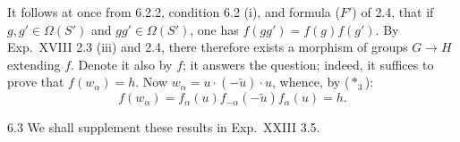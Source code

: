 It follows at once from 6.2.2, condition 6.2 (i), and formula ($F'$) of 2.4, that if $g,g'\in\Omega(S')$ and $gg'\in\Omega(S')$, one has $f(gg')=f(g)f(g')$. By Exp.~XVIII 2.3 (iii) and 2.4,{\renewcommand{\thefootnote}{(39)}} there therefore exists a morphism of groups $G\to H$ extending $f$. Denote it also by $f$; it answers the question; indeed, it suffices to prove that $f(w_\alpha)=h$. Now $w_\alpha=u\cdot(-\widetilde u)\cdot u$, whence, by ($*_3$):{\renewcommand{\thefootnote}{(40)}}
\[
f(w_\alpha)=f_\alpha(u)f_{-\alpha}(-\widetilde u)f_\alpha(u)=h.
\]
\begin{remark}{6.3}\label{XX.6.3}
We shall supplement these results in Exp.~XXIII 3.5.
\end{remark}
